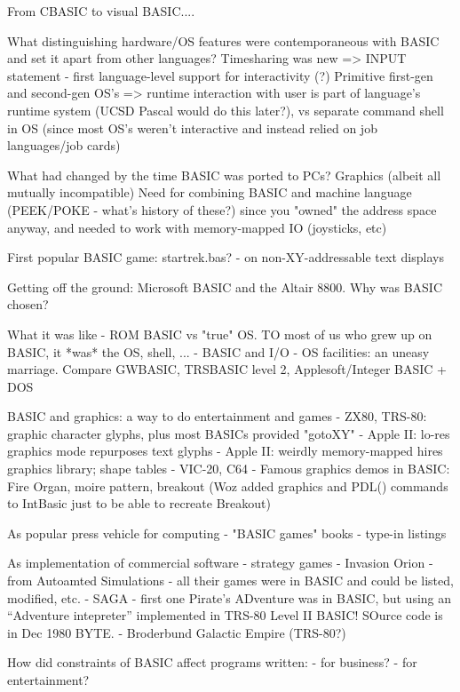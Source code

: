 \documentclass{article}
\begin{document}
From CBASIC to visual BASIC....

What distinguishing hardware/OS features were contemporaneous with BASIC
and set it apart from other languages?
   Timesharing was new => INPUT statement - first language-level support for
     interactivity  (?)
   Primitive first-gen and second-gen OS's => runtime interaction with
     user is part of language's runtime system (UCSD Pascal would do
     this later?), vs separate command shell in OS (since most OS's
     weren't interactive and instead relied on job languages/job cards)

What had changed by the time BASIC was ported to PCs?
   Graphics (albeit all mutually incompatible)
   Need for combining BASIC and machine language (PEEK/POKE - what's
   history of these?) since you "owned" the address space anyway, and
   needed to work with memory-mapped IO (joysticks, etc)

First popular BASIC game: startrek.bas?
  - on non-XY-addressable text displays

Getting off the ground: Microsoft BASIC and the Altair 8800.  Why was
    BASIC chosen?

What it was like
  - ROM BASIC vs "true" OS.  TO most of us who grew up on BASIC, it
  *was* the OS, shell, ...
  - BASIC and I/O - OS facilities: an uneasy marriage.  Compare GWBASIC,
  TRSBASIC level 2, Applesoft/Integer BASIC + DOS

BASIC and graphics: a way to do entertainment and games
  - ZX80, TRS-80: graphic character glyphs, plus most BASICs provided "gotoXY"
  - Apple II: lo-res graphics mode repurposes text glyphs
  - Apple II: weirdly memory-mapped hires graphics library; shape tables
  - VIC-20, C64
  - Famous graphics demos in BASIC: Fire Organ, moire pattern, breakout
  (Woz added graphics and PDL() commands to IntBasic just to be able to
  recreate Breakout)

As popular press vehicle for computing
  - "BASIC games" books
  - type-in listings

As implementation of commercial software - strategy games
  - Invasion Orion - from Autoamted Simulations - all their games were
  in BASIC and could be listed, modified, etc.
  - SAGA - first one Pirate's ADventure was in BASIC, but using an
  ``Adventure intepreter'' implemented in TRS-80 Level II BASIC!  SOurce
  code is in Dec 1980 BYTE.
  - Broderbund Galactic Empire (TRS-80?)


How did constraints of BASIC affect programs written:
- for business?
- for entertainment?
\end{document}
